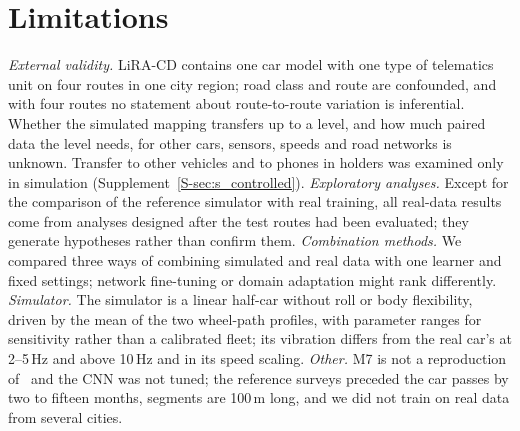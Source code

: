 \section{Limitations}
\label{sec:limitations}
\emph{External validity.}
LiRA-CD contains one car model with one type of telematics unit on four routes in one city region; road class and route are confounded, and with four routes no statement about route-to-route variation is inferential.
Whether the simulated mapping transfers up to a level, and how much paired data the level needs, for other cars, sensors, speeds and road networks is unknown.
Transfer to other vehicles and to phones in holders was examined only in simulation (Supplement~\ref{S-sec:s_controlled}).
\emph{Exploratory analyses.}
Except for the comparison of the reference simulator with real training, all real-data results come from analyses designed after the test routes had been evaluated; they generate hypotheses rather than confirm them.
\emph{Combination methods.}
We compared three ways of combining simulated and real data with one learner and fixed settings; network fine-tuning or domain adaptation might rank differently.
\emph{Simulator.}
The simulator is a linear half-car without roll or body flexibility, driven by the mean of the two wheel-path profiles, with parameter ranges for sensitivity rather than a calibrated fleet; its vibration differs from the real car's at 2--5\,Hz and above 10\,Hz and in its speed scaling.
\emph{Other.}
M7 is not a reproduction of~\cite{skar2024inversion} and the CNN was not tuned; the reference surveys preceded the car passes by two to fifteen months, segments are 100\,m long, and we did not train on real data from several cities.
